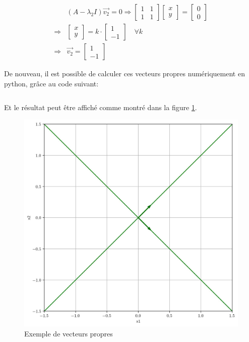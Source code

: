         \begin{equation}
            \begin{split}
                &(A - \lambda_2 I)\overrightarrow{v_2} = 0 \Rightarrow \begin{bmatrix} 1 & 1 \\ 1 & 1 \end{bmatrix} \begin{bmatrix} x \\ y \end{bmatrix} = \begin{bmatrix} 0 \\ 0 \end{bmatrix}\\
                \Rightarrow& \begin{bmatrix} x \\ y \end{bmatrix} = k \cdot \begin{bmatrix} 1 \\ -1 \end{bmatrix} \quad \forall k \\
                \Rightarrow& \overrightarrow{v_2} = \begin{bmatrix} 1 \\ -1 \end{bmatrix}
            \end{split}
        \end{equation}

        De nouveau, il est possible de calculer ces vecteurs propres numériquement en python, grâce au code suivant:
        \inputminted{python}{codes/vecteurs_propres.py}
        Et le résultat peut être affiché comme montré dans la figure \ref{fig:vecteurs_propres}.
        \begin{figure}[ht!]
            \centering
            \includegraphics[width=\textwidth]{images/vecteurs_propres.jpg}
            \caption{Exemple de vecteurs propres}
            \label{fig:vecteurs_propres}
        \end{figure}
        

